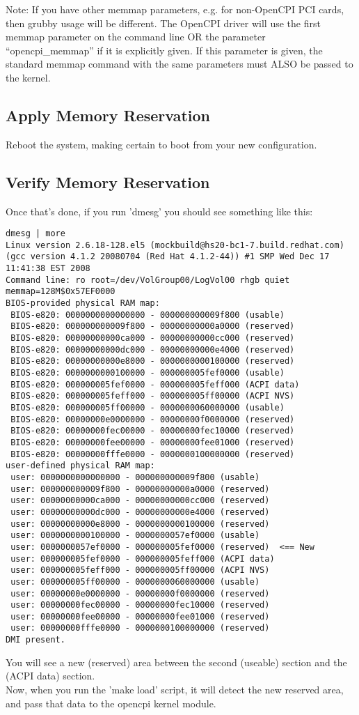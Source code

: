 \begin{flushleft}
\bigskip
Note: If you have other memmap parameters, e.g. for non-OpenCPI PCI cards,
then grubby usage will be different. The OpenCPI driver will use the first
memmap parameter on the command line OR the parameter ``opencpi\_memmap'' if it
is explicitly given. If this parameter is given, the standard memmap command
with the same parameters must ALSO be passed to the kernel.\\
\subsection{Apply Memory Reservation}
Reboot the system, making certain to boot from your new configuration.
\subsection{Verify Memory Reservation}
Once that's done, if you run 'dmesg' you should see something like this:\\
\bigskip
\begin{lstlisting}
dmesg | more
Linux version 2.6.18-128.el5 (mockbuild@hs20-bc1-7.build.redhat.com) (gcc version 4.1.2 20080704 (Red Hat 4.1.2-44)) #1 SMP Wed Dec 17 11:41:38 EST 2008
Command line: ro root=/dev/VolGroup00/LogVol00 rhgb quiet memmap=128M$0x57EF0000
BIOS-provided physical RAM map:
 BIOS-e820: 0000000000000000 - 000000000009f800 (usable)
 BIOS-e820: 000000000009f800 - 00000000000a0000 (reserved)
 BIOS-e820: 00000000000ca000 - 00000000000cc000 (reserved)
 BIOS-e820: 00000000000dc000 - 00000000000e4000 (reserved)
 BIOS-e820: 00000000000e8000 - 0000000000100000 (reserved)
 BIOS-e820: 0000000000100000 - 000000005fef0000 (usable)
 BIOS-e820: 000000005fef0000 - 000000005feff000 (ACPI data)
 BIOS-e820: 000000005feff000 - 000000005ff00000 (ACPI NVS)
 BIOS-e820: 000000005ff00000 - 0000000060000000 (usable)
 BIOS-e820: 00000000e0000000 - 00000000f0000000 (reserved)
 BIOS-e820: 00000000fec00000 - 00000000fec10000 (reserved)
 BIOS-e820: 00000000fee00000 - 00000000fee01000 (reserved)
 BIOS-e820: 00000000fffe0000 - 0000000100000000 (reserved)
user-defined physical RAM map:
 user: 0000000000000000 - 000000000009f800 (usable)
 user: 000000000009f800 - 00000000000a0000 (reserved)
 user: 00000000000ca000 - 00000000000cc000 (reserved)
 user: 00000000000dc000 - 00000000000e4000 (reserved)
 user: 00000000000e8000 - 0000000000100000 (reserved)
 user: 0000000000100000 - 0000000057ef0000 (usable)
 user: 0000000057ef0000 - 000000005fef0000 (reserved)  <== New
 user: 000000005fef0000 - 000000005feff000 (ACPI data)
 user: 000000005feff000 - 000000005ff00000 (ACPI NVS)
 user: 000000005ff00000 - 0000000060000000 (usable)
 user: 00000000e0000000 - 00000000f0000000 (reserved)
 user: 00000000fec00000 - 00000000fec10000 (reserved)
 user: 00000000fee00000 - 00000000fee01000 (reserved)
 user: 00000000fffe0000 - 0000000100000000 (reserved)
DMI present.
\end{lstlisting}

You will see a new (reserved) area between the second (useable) section and the
(ACPI data) section.\\
\bigskip
Now, when you run the 'make load' script, it will detect the new reserved
area, and pass that data to the opencpi kernel module. \\
\end{flushleft}
